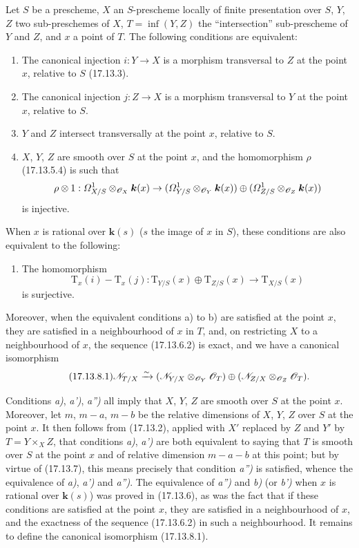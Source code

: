 \begin{proposition}[17.13.8]
\label{IV.17.13.8}
Let $S$ be a prescheme, $X$ an $S$-prescheme locally of finite presentation over $S$, $Y$, $Z$ two sub-preschemes of $X$, $T=\inf(Y,Z)$ the ``intersection'' sub-prescheme of $Y$ and $Z$, and $x$ a point of $T$. The following conditions are equivalent:
\begin{enumerate}
  \item[\textup{a)}] The canonical injection $i:Y\to X$ is a morphism transversal to $Z$ at the point $x$, relative to $S$ \textup{(17.13.3)}.
  \item[\textup{a$'$)}] The canonical injection $j:Z\to X$ is a morphism transversal to $Y$ at the point $x$, relative to $S$.
  \item[\textup{a$''$)}] $Y$ and $Z$ intersect transversally at the point $x$, relative to $S$.
  \item[\textup{b)}] $X$, $Y$, $Z$ are smooth over $S$ at the point $x$, and the homomorphism $\rho$ \textup{(17.13.5.4)} is such that
  \[
  \rho\otimes1:\varOmega^1_{X/S}\otimes_{\mathscr{O}_X}\boldsymbol{k}(x)\to
  (\varOmega^1_{Y/S}\otimes_{\mathscr{O}_Y}\boldsymbol{k}(x))\oplus
  (\varOmega^1_{Z/S}\otimes_{\mathscr{O}_Z}\boldsymbol{k}(x))
  \]
  is injective.
\end{enumerate}
When $x$ is rational over $\boldsymbol{k}(s)$ \textup{(}$s$ the image of $x$ in $S$\textup{)}, these conditions are also equivalent to the following:
\begin{enumerate}
  \item[\textup{b$'$)}] The homomorphism
  \[
  \mathrm{T}_x(i)-\mathrm{T}_x(j):\mathrm{T}_{Y/S}(x)\oplus\mathrm{T}_{Z/S}(x)\to\mathrm{T}_{X/S}(x)
  \]
  is surjective.
\end{enumerate}
Moreover, when the equivalent conditions \textup{a)} to \textup{b)} are satisfied at the point $x$, they are satisfied in a neighbourhood of $x$ in $T$, and, on restricting $X$ to a neighbourhood of $x$, the sequence (17.13.6.2) is exact, and we have a canonical isomorphism
\[
\label{IV.17.13.8.1}
\tag{17.13.8.1}
\mathscr{N}_{T/X}\xrightarrow{\sim}
(\mathscr{N}_{Y/X}\otimes_{\mathscr{O}_Y}\mathscr{O}_T)\oplus
(\mathscr{N}_{Z/X}\otimes_{\mathscr{O}_Z}\mathscr{O}_T).
\]
\end{proposition}

Conditions \emph{a)}, \emph{a')}, \emph{a'')} all imply that $X$, $Y$, $Z$ are smooth over $S$ at the point $x$. Moreover, let $m$, $m-a$, $m-b$ be the relative dimensions of $X$, $Y$, $Z$ over $S$ at the point $x$. It then follows from (17.13.2), applied with $X'$ replaced by $Z$ and $Y'$ by $T=Y\times_XZ$, that conditions \emph{a)}, \emph{a')} are both equivalent to saying that $T$ is smooth over $S$ at the point $x$ and of relative dimension $m-a-b$ at this point; but by virtue of (17.13.7), this means precisely that condition \emph{a'')} is satisfied, whence the equivalence of \emph{a)}, \emph{a')} and \emph{a'')}. The equivalence of \emph{a'')} and \emph{b)} (or \emph{b')} when $x$ is rational over $\boldsymbol{k}(s)$) was proved in (17.13.6), as was the fact that if these conditions are satisfied at the point $x$, they are satisfied in a neighbourhood of $x$, and the exactness of the sequence (17.13.6.2) in such a neighbourhood. It remains to define the canonical isomorphism (17.13.8.1).

